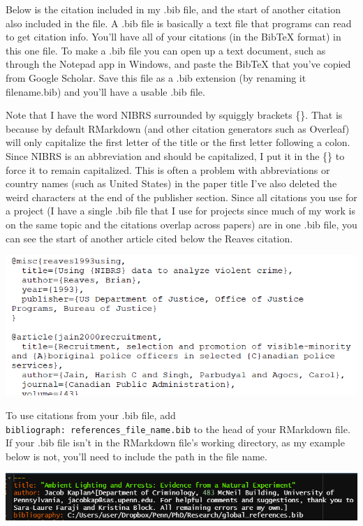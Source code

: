 \documentclass[
  12pt,
]{book}
\begin{document}
Below is the citation included in my .bib file, and the start of another citation also included in the file. A .bib file is basically a text file that programs can read to get citation info. You'll have all of your citations (in the BibTeX format) in this one file. To make a .bib file you can open up a text document, such as through the Notepad app in Windows, and paste the BibTeX that you've copied from Google Scholar. Save this file as a .bib extension (by renaming it filename.bib) and you'll have a usable .bib file.

Note that I have the word NIBRS surrounded by squiggly brackets \{\}. That is because by default RMarkdown (and other citation generators such as Overleaf) will only capitalize the first letter of the title or the first letter following a colon. Since NIBRS is an abbreviation and should be capitalized, I put it in the \{\} to force it to remain capitalized. This is often a problem with abbreviations or country names (such as United States) in the paper title I've also deleted the weird characters at the end of the publisher section. Since all citations you use for a project (I have a single .bib file that I use for projects since much of my work is on the same topic and the citations overlap across papers) are in one .bib file, you can see the start of another article cited below the Reaves citation.

\includegraphics{images/bibtex_example.PNG}

To use citations from your .bib file, add \texttt{bibliograph:\ references\_file\_name.bib} to the head of your RMarkdown file. If your .bib file isn't in the RMarkdown file's working directory, as my example below is not, you'll need to include the path in the file name.

\includegraphics{images/rmarkdown_bib.PNG}
\end{document}
